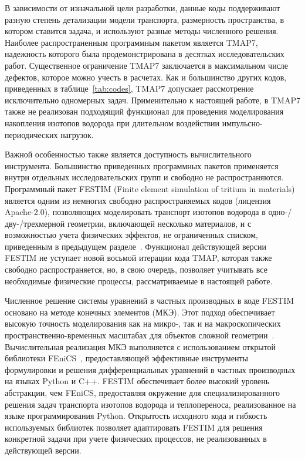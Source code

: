 В зависимости от изначальной цели разработки, данные коды поддерживают разную степень детализации модели транспорта, размерность пространства, в котором ставится задача, и используют разные методы численного решения. Наиболее распространенным программным пакетом является TMAP7, надежность которого была продемонстрирована в десятках исследовательских работ. Существенное ограничение TMAP7 заключается в максимальном числе дефектов, которое можно учесть в расчетах. Как и большинство других кодов, приведенных в таблице~\cref{tab:codes}, TMAP7 допускает рассмотрение исключительно одномерных задач. Применительно к настоящей работе, в TMAP7 также не реализован подходящий функционал для проведения моделирования накопления изотопов водорода при длительном воздействии импульсно-периодических нагрузок.

Важной особенностью также является доступность вычислительного инструмента. Большинство приведенных программных пакетов применяется внутри отдельных исследовательских групп и свободно не распространяются. Программный пакет FESTIM (Finite element simulation of tritium in materials) является одним из немногих свободно распространяемых кодов (лицензия Apache-2.0), позволяющих моделировать транспорт изотопов водорода в одно-/дву-/трехмерной геометрии, включающей несколько материалов, и с возможностью учета физических эффектов, не ограниченных списком, приведенным в предыдущем разделе~\cite{Kulagin2024}. Функционал действующей версии FESTIM не уступает новой восьмой итерации кода TMAP, которая также свободно распространяется, но, в свою очередь, позволяет учитывать все необходимые физические процессы, рассматриваемые в настоящей работе.

Численное решение системы уравнений в частных производных в коде FESTIM основано на методе конечных элементов (МКЭ). Этот подход обеспечивает высокую точность моделирования как на микро-, так и на макроскопических пространственно-временных масштабах для объектов сложной геометрии~\cite{Nordlund2014}. Вычислительная реализация МКЭ выполняется с использованием открытой библиотеки FEniCS~\cite{FEniCS}, предоставляющей эффективные инструменты формулировки и решения дифференциальных уравнений в частных производных на языках Python и C++. FESTIM обеспечивает более высокий уровень абстракции, чем FEniCS, предоставляя окружение для специализированного решения задач транспорта изотопов водорода и теплопереноса, реализованное на языке программирования Python. Открытость исходного кода и гибкость используемых библиотек позволяет адаптировать FESTIM для решения конкретной задачи при учете физических процессов, не реализованных в действующей версии.

